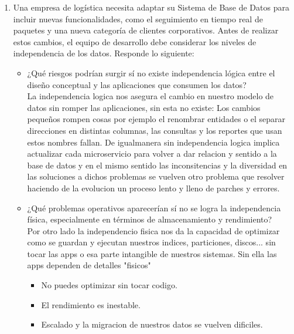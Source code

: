 \documentclass[12pt]{report}
\begin{document}
\begin{enumerate}[label=\textbf{\arabic*.}, leftmargin=*]
\begin{enumerate}[label=\textbf{\alph*.}, leftmargin=*, itemsep=1.0em]
\textbf{Recomendación}
Por lo que para una empresa en crecimiento que busca centralizar operaciones de ventas, clientes, inventario y logística, la mejor opción es \textbf{PostgreSQL}, ya que ofrece mayor capacidad de escalabilidad, solidez en el manejo de datos complejos y ausencia de costos de versiones empresariales o licencias. Por que hay que tener en cuenta que MySQL es adecuado para proyectos pequeños o con requerimientos menos complejos, pero PostgreSQL proporciona una base más robusta y preparada para el crecimiento a largo plazo.






\item Una empresa de log\'istica necesita adaptar su Sistema de Base de Datos para incluir nuevas funcionalidades, como el seguimiento en tiempo real de paquetes y una nueva categor\'ia de clientes corporativos. Antes de realizar estos cambios, el equipo de desarrollo debe considerar los niveles de independencia de los datos. Responde lo siguiente:
\begin{itemize}
  \item ¿Qu\'e riesgos podr\'ian surgir s\'i no existe independencia l\'ogica entre el dise\~no conceptual y las aplicaciones que consumen los datos?\\

        La independencia logica nos asegura el cambio en nuestro modelo de datos sin romper las aplicaciones, sin esta no existe:
        Los cambios pequeños rompen cosas por ejemplo el renombrar entidades o el separar direcciones en distintas columnas, las consultas y los reportes que usan estos nombres fallan.
        De igualmanera sin independencia logica implica actualizar cada microservicio para volver a dar relacion y sentido a la base de datos y en el mismo sentido las inconsitencias y la diversidad en las soluciones a dichos problemas se vuelven otro problema que resolver haciendo de la evolucion un proceso lento y lleno de parches y errores.\\


  \item ¿Qu\'e problemas operativos aparecer\'ian s\'i no se logra la independencia f\'isica, especialmente en t\'erminos de almacenamiento y rendimiento?\\

        Por otro lado la independencio fisica nos da la capacidad de optimizar como se guardan y ejecutan nuestros indices, particiones, discos... sin tocar las apps o esa parte intangible de nuestros sistemas. Sin ella las apps dependen de detalles "fisicos"
        \begin{itemize}
            \item No puedes optimizar sin tocar codigo.
            \item El rendimiento es inestable.
            \item Escalado y la migracion de nuestros datos se vuelven dificiles.\\
        \end{itemize}



\end{itemize}
\end{enumerate}
\end{enumerate}
\end{document}
